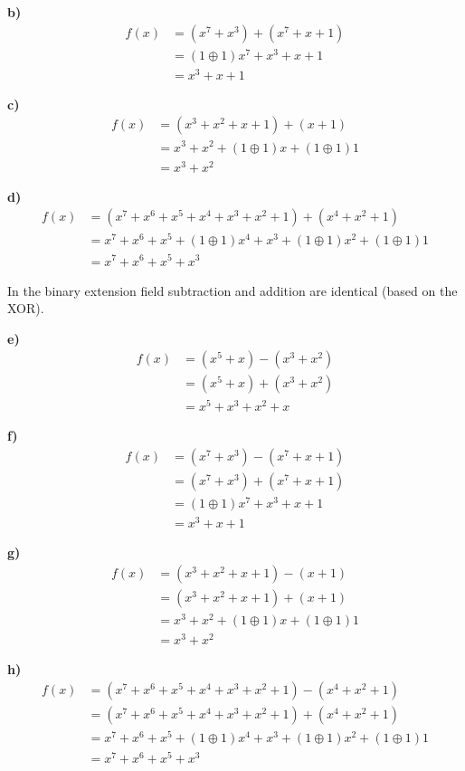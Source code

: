 \noindent\textbf{b)}
\begin{align}
    f(x)  &= (x^7 + x^3) + (x^7 + x + 1) \\
    &= (1 \oplus 1)x^7 + x^3 + x + 1\\
    &= x^3 + x + 1
\end{align}

\noindent\textbf{c)}
\begin{align}
    f(x)  &= (x^3 + x^2 + x + 1) + (x + 1) \\
    &= x^3 + x^2 + (1 \oplus 1)x + (1 \oplus 1)1\\
    &= x^3 + x^2
\end{align}

\noindent\textbf{d)}
\begin{align}
    f(x)  &= (x^7 + x^6 + x^5 + x^4 + x^3 + x^2 + 1) + (x^4 + x^2 + 1) \\
    &= x^7 + x^6 + x^5 + (1 \oplus 1)x^4 + x^3 + (1 \oplus 1)x^2 + (1 \oplus 1)1\\
    &= x^7 + x^6 + x^5 + x^3
\end{align}

\noindent In the binary extension field subtraction and addition are identical (based on the XOR).

\noindent\textbf{e)}
\begin{align}
    f(x)  &= (x^5 + x) - (x^3 + x^2) \\
    &= (x^5 + x) + (x^3 + x^2) \\
    &= x^5 + x^3 + x^2 + x
\end{align}

\noindent\textbf{f)}
\begin{align}
    f(x)  &= (x^7 + x^3) - (x^7 + x + 1) \\
    &= (x^7 + x^3) + (x^7 + x + 1) \\
    &= (1 \oplus 1)x^7 + x^3 + x + 1\\
    &= x^3 + x + 1
\end{align}

\noindent\textbf{g)}
\begin{align}
    f(x)  &= (x^3 + x^2 + x + 1) - (x + 1) \\
    &= (x^3 + x^2 + x + 1) + (x + 1) \\
    &= x^3 + x^2 + (1 \oplus 1)x + (1 \oplus 1)1\\
    &= x^3 + x^2
\end{align}

\noindent\textbf{h)}
\begin{align}
    f(x)  &= (x^7 + x^6 + x^5 + x^4 + x^3 + x^2 + 1) - (x^4 + x^2 + 1) \\
    &= (x^7 + x^6 + x^5 + x^4 + x^3 + x^2 + 1) + (x^4 + x^2 + 1) \\
    &= x^7 + x^6 + x^5 + (1 \oplus 1)x^4 + x^3 + (1 \oplus 1)x^2 + (1 \oplus 1)1\\
    &= x^7 + x^6 + x^5 + x^3
\end{align}

\pagebreak